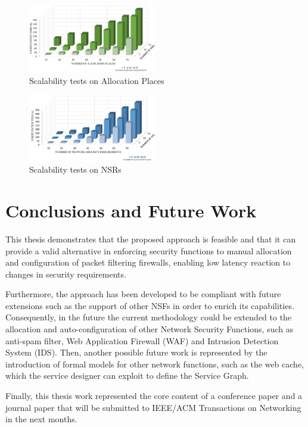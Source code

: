 \documentclass[10pt,a4paper,roman, twocolumn]{article}
\begin{document}
\begin{figure} [tbh]
	\centerline{\includegraphics[width=0.5\textwidth]{images/scalability01.pdf}}
	\caption{Scalability tests on Allocation Places}
	\label{fig:perf01}
\end{figure}


\begin{figure} [tbh]
	\centerline{\includegraphics[width=0.5\textwidth]{images/scalability02.pdf}}
	\caption{Scalability tests on NSRs}
	\label{fig:perf02}
\end{figure}

\section{Conclusions and Future Work}
	 
This thesis demonstrates that the proposed approach is feasible and that it can provide a valid alternative in enforcing security functions to manual allocation and configuration of packet filtering firewalls, enabling low latency reaction to changes in security requirements. 

Furthermore, the approach has been developed to be compliant with future extensions such as the support of other NSFs in order to enrich its capabilities. Consequently, in the future the current methodology could be extended to the allocation and auto-configuration of other Network Security Functions, such as anti-spam filter, Web Application Firewall (WAF) and Intrusion Detection System (IDS). %
Then, another possible future work is represented by the introduction of formal models for other network functions, such as the web cache, which the service designer can exploit to define the Service Graph.


Finally, this thesis work represented the core content of a conference paper and a journal paper that will be submitted to IEEE/ACM Transactions on Networking in the next months.
	 
\end{document}
